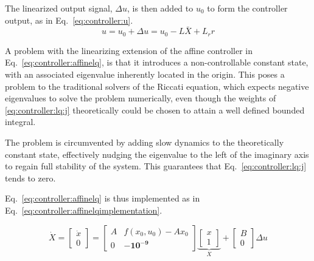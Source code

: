     The linearized output signal, $\Delta u$, is then added
    to $u_{0}$ to form the controller output, as in Eq.~\eqref{eq:controller:u}.
    \begin{equation}
    \label{eq:controller:u}
        u = u_{0} + \Delta u = u_{0} - L\bar{X} + L_{r}r
    \end{equation}

    A problem with the linearizing extension of the affine controller in Eq.~\eqref{eq:controller:affinelq},
    is that it introduces a non-controllable constant state, with
    an associated eigenvalue inherently located in the origin.
    This poses a problem to the traditional solvers of the Riccati equation, which
    expects negative eigenvalues to solve the problem numerically, even though
    the weights of \eqref{eq:controller:lq:j} theoretically could be chosen to
    attain a well defined bounded integral.

    The problem is circumvented by adding slow dynamics to the theoretically
    constant state, effectively nudging the eigenvalue to the left of the
    imaginary axis to regain full stability of the system.
    This guarantees that Eq.~\eqref{eq:controller:lq:j} tends to zero.

    Eq.~\eqref{eq:controller:affinelq} is thus implemented as in Eq.~\eqref{eq:controller:affinelqimplementation}.

    \begin{equation}
    \label{eq:controller:affinelqimplementation}
        \dot{X} = \left[
        \begin{array}{c}
            \dot{x} \\
            0
        \end{array}\right] =
        \left[
        \begin{array}{cc}
            A & f(x_{0},u_{0})-Ax_{0} \\
            0 & \mathbf{-10^{-9}}
        \end{array}\right]
        \underbrace{\left[
        \begin{array}{c}
            x \\
            1
        \end{array}\right]}_{X}
        +
        \left[
        \begin{array}{c}
            B \\
            0
        \end{array}\right]
        \Delta u
    \end{equation}
